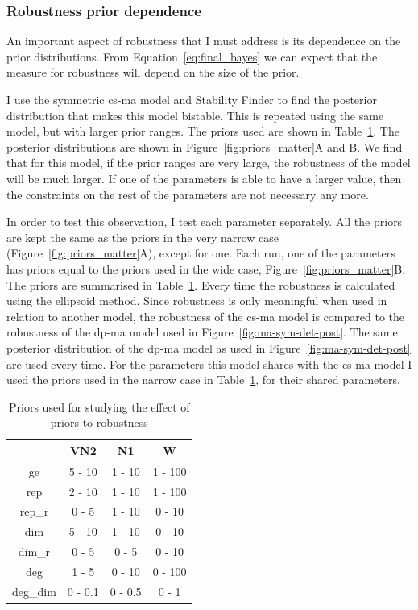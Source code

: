 \subsubsection{Robustness prior dependence}

An important aspect of robustness that I must address is its dependence on the prior distributions. From Equation~\ref{eq:final_bayes} we can expect that the measure for robustness will depend on the size of the prior. 

I use the symmetric \acrshort{cs-ma} model and Stability Finder to find the posterior distribution that makes this model bistable. This is repeated using the same model, but with larger prior ranges. The priors used are shown in Table~\ref{tab:prior_study}. The posterior distributions are shown in Figure~\ref{fig:priors_matter}A and B. We find that for this model, if the prior ranges are very large, the robustness of the model will be much larger. If one of the parameters is able to have a larger value, then the constraints on the rest of the parameters are not necessary any more. 

In order to test this observation, I test each parameter separately. All the priors are kept the same as the priors in the very narrow case (Figure~\ref{fig:priors_matter}A), except for one. Each run, one of the parameters has priors equal to the priors used in the wide case, Figure~\ref{fig:priors_matter}B. The priors are summarised in Table~\ref{tab:prior_study}. Every time the robustness is calculated using the ellipsoid method. Since robustness is only meaningful when used in relation to another model, the robustness of the \acrshort{cs-ma} model is compared to the robustness of the \acrshort{dp-ma} model used in Figure~\ref{fig:ma-sym-det-post}. The same posterior distribution of the \acrshort{dp-ma} model as used in Figure~\ref{fig:ma-sym-det-post} are used every time. For the parameters this model shares with the \acrshort{cs-ma} model I used the priors used in the narrow case in Table~\ref{tab:prior_study}, for their shared parameters. 



\begin{table}[htbp]
\centering
\caption{Priors used for studying the effect of priors to robustness}
\label{tab:prior_study}
\begin{tabular}{@{}cccc@{}}
\toprule
         & VN2 & N1  & W    \\ \midrule
ge       & 5 - 10      & 1 - 10  & 1 - 100 \\
rep      & 2 - 10      & 1 - 10  & 1 - 100 \\
rep\_r   & 0 - 5       & 1 - 10  & 0 - 10  \\
dim      & 5 - 10      & 1 - 10  & 0 - 10  \\
dim\_r   & 0 - 5       & 0 - 5   & 0 - 10  \\
deg      & 1 - 5       & 0 - 10  & 0 - 100 \\
deg\_dim & 0 - 0.1     & 0 - 0.5 & 0 - 1   \\ \bottomrule
\end{tabular}
\end{table}

